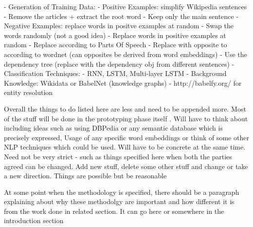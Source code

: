 \documentclass[a4paper, 11pt]{article}
\begin{document}



  - Generation of Training Data:
    - Positive Examples: simplify Wikipedia sentences 
    	- Remove the articles + extract the root word
    	- Keep only the main sentence
    - Negative Examples: replace words in positve examples at random
    	- Swap the words randomly (not a good idea)
    	- Replace words in positive examples at random
    	- Replace according to Parts Of Speech
    	- Replace with opposite to according to wordnet (can opposites be derived from word embeddings)
    	- Use the dependency tree (replace with the dependency obj from different sentences)
  - Classification Techniques:
    - RNN, LSTM, Multi-layer LSTM
    - Background Knowledge: Wikidata or BabelNet (knowledge graphs)
      - http://babelfy.org/ for entity resolution


\color{red}
Overall the things to do listed here are less and need to be appended more. Most of the stuff will be done in the prototyping phase itself . Will have to think about including ideas such as using DBPedia or any semantic database which is precisely expressed, Usage of any specific word embeddings or think of some other NLP techniques which could be used. Will have to be concrete at the same time. Need not be very strict - such as things specified here when both the parties agreed can be changed. Add new stuff, delete some other stuff and change or take a new direction. Things are possible but be reasonable

At some point when the methodology is specified, there should be a paragraph explaining about why these methodolgy are important and how different it is from the work done in related section. It can go here or somewhere in the introduction section
\color{black}
\end{document}
